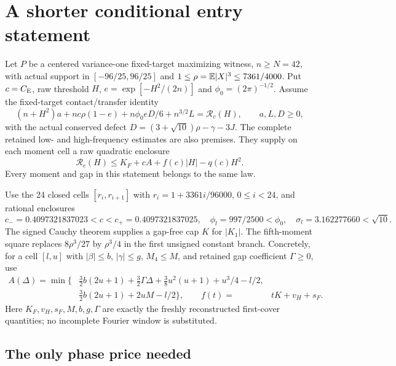 \section{A shorter conditional entry statement}

Let $P$ be a centered variance-one fixed-target maximizing witness,
$n\ge N=42$, with actual support in $[-96/25,96/25]$ and
$1\le\rho=\mathbb E|X|^3\le7361/4000$. Put $c=C_{\mathrm E}$, raw threshold $H$,
$e=\exp[-H^2/(2n)]$ and $\phi_0=(2\pi)^{-1/2}$.
Assume the fixed-target contact/transfer identity
\begin{equation}\label{twopass:identity}
 (n+H^2)a+nc\rho(1-e)+n\phi_0 eD/6+n^{3/2}L=\mathcal R_c(H),
 \qquad a,L,D\ge0,
\end{equation}
with the actual conserved defect
$D=(3+\sqrt{10})\rho-\gamma-3J$.
The complete retained low- and high-frequency estimates are also premises.
They supply on each moment cell a raw quadratic enclosure
\begin{equation}\label{twopass:raw}
 \mathcal R_c(H)\le K_F+cA+f(c)|H|-q(c)H^2.
\end{equation}
Every moment and gap in this statement belongs to the same law.

Use the 24 closed cells $[r_i,r_{i+1}]$ with
$r_i=1+3361i/96000$, $0\le i<24$, and rational enclosures
\[
 c_-=0.4097321837023<c<c_+=0.4097321837025,
 \quad\phi_l=997/2500<\phi_0,\quad
 \sigma_l=3.162277660<\sqrt{10}.
\]
The signed Cauchy theorem supplies a gap-free cap $K$ for $|K_1|$.
The fifth-moment square replaces $8\rho^3/27$ by $\rho^3/4$ in the
first unsigned constant branch. Concretely, for a cell $[l,u]$ with
$|\beta|\le b$, $|\gamma|\le g$, $M_4\le M$, and retained gap coefficient
$\Gamma\ge0$, use
\begin{align*}
 A(\Delta)=\min\bigl\{&\tfrac32b(2u+1)+\tfrac32\Gamma\Delta
       +\tfrac38u^2(u+1)+u^3/4-l/2,\\
                     &\tfrac32b(2u+1)+2uM-l/2\bigr\},
 \qquad f(t)={}&tK+v_H+s_F.
\end{align*}
Here $K_F,v_H,s_F,M,b,g,\Gamma$ are exactly the freshly reconstructed
first-cover quantities; no incomplete Fourier window is substituted.

\subsection{The only phase price needed}

